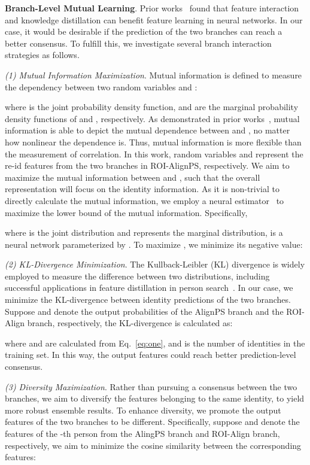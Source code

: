 \documentclass[journal]{IEEEtran}
\begin{document}
\textbf{Branch-Level Mutual Learning}. Prior works~\cite{DBLP:journals/pami/LiH18a,DBLP:conf/iccv/PengLZLQT19,Hong_2021_CVPR,Dai_2021_CVPR} found that feature interaction and knowledge distillation can benefit feature learning in neural networks. In our case, it would be desirable if the prediction of the two branches can reach a better consensus. To fulfill this, we investigate several branch interaction strategies as follows.

\textit{(1) Mutual Information Maximization}. Mutual information is defined to measure the dependency between two random variables  and :

where  is the joint probability density function,  and  are the marginal probability density functions of  and , respectively. As demonstrated in prior works~\cite{Kinney3354,DBLP:conf/iclr/HjelmFLGBTB19}, mutual information is able to depict the mutual dependence between  and , no matter how nonlinear the dependence is. Thus, mutual information is more flexible than the measurement of correlation. In this work, random variables  and  represent the re-id features from the two branches in ROI-AlignPS, respectively. We aim to maximize the mutual information between  and , such that the overall representation will focus on the identity information. As it is non-trivial to directly calculate the mutual information, we employ a neural estimator~\cite{DBLP:conf/icml/BelghaziBROBHC18} to maximize the lower bound of the mutual information. Specifically, 

where  is the joint distribution and  represents the marginal distribution,  is a neural network parameterized by . To maximize , we minimize its negative value:


\textit{(2) KL-Divergence Minimization}. 
The Kullback-Leibler (KL) divergence is widely employed to measure the difference between two distributions, including successful applications in feature distillation in person search~\cite{DBLP:conf/cvpr/DongZST20a,DBLP:conf/aaai/ZhangWBSY21}. In our case, we minimize the KL-divergence between identity predictions of the two branches. Suppose  and  denote the output probabilities of the AlignPS branch and the ROI-Align branch, respectively, the KL-divergence is calculated as:

where  and  are calculated from Eq.~\ref{eq:one}, and  is the number of identities in the training set. In this way, the output features could reach better prediction-level consensus.

\textit{(3) Diversity Maximization}. Rather than pursuing a consensus between the two branches, we aim to diversify the features belonging to the same identity, to yield more robust ensemble results.
To enhance diversity, we promote the output features of the two branches to be different. Specifically, suppose  and  denote the features of the -th person from the AlingPS branch and ROI-Align branch, respectively, we aim to minimize the cosine similarity between the corresponding features:
\end{document}
